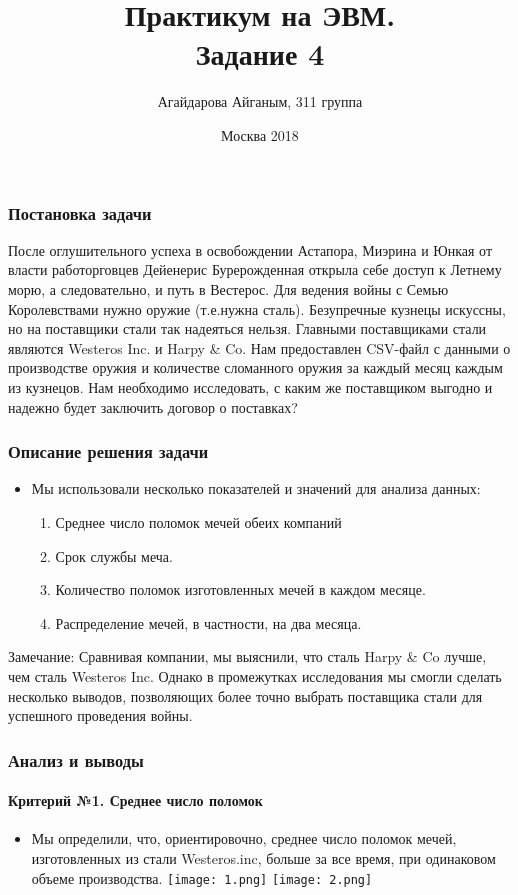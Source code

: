 \documentclass[8pt,pdf,hyperref={unicode}]{beamer}
\title{   Практикум на ЭВМ.\\     Задание 4}
\institute{Московский Государственный Университет М.В Ломоносова\\
					Факультет Вычислительной математики и Кибернетики\\
						Кафедра Исследования Операций\\}
\author{Агайдарова Айганым, 311 группа}
\date{Москва 2018}
\begin{document}
	\begin{frame}
		\titlepage
	\end{frame}
	
	\begin{frame}	
		\frametitle{Постановка задачи}
После оглушительного успеха в освобождении Астапора, Миэрина и Юнкая от власти работорговцев Дейенерис Бурерожденная открыла себе доступ к Летнему морю, а следовательно, и путь в Вестерос.
Для ведения войны с Семью Королевствами нужно оружие (т.е.нужна сталь). Безупречные кузнецы искуссны, но на поставщики стали так надеяться нельзя.
Главными поставщиками стали являются Westeros Inc. и Harpy \& Co.
Нам предоставлен CSV-файл с данными о производстве оружия и количестве сломанного оружия за каждый месяц каждым из кузнецов.
Нам необходимо исследовать, с каким же поставщиком выгодно и надежно будет заключить договор о поставках?
	\end{frame}
	
	\begin{frame}
		\frametitle{ Описание решения задачи }
		\begin{itemize}
		\item Мы использовали несколько показателей и значений для анализа данных:\\
		\begin{enumerate}
			\item Среднее число поломок мечей обеих компаний
			\item Срок службы меча. 
			\item Количество поломок изготовленных мечей в каждом месяце.
			\item Распределение мечей, в частности, на два месяца.

		\end{enumerate}
		\end{itemize}	

		Замечание: Сравнивая компании, мы выяснили, что сталь Harpy \& Co лучше, чем сталь Westeros Inc. Однако в промежутках исследования мы смогли сделать несколько выводов, позволяющих более точно выбрать поставщика стали для успешного проведения войны.		
	\end{frame}		
		
	\begin{frame}
	\frametitle{Анализ и выводы}
	\framesubtitle{Критерий №1. Среднее число поломок}
		\begin{itemize}
			\item  Мы определили, что, ориентировочно, среднее число поломок мечей, изготовленных из стали Westeros.inc, больше за все время, при одинаковом объеме производства.
			\texttt{[image: 1.png]}
			\texttt{[image: 2.png]} 
		\end{itemize}
	\end{frame}
			
\end{document}
